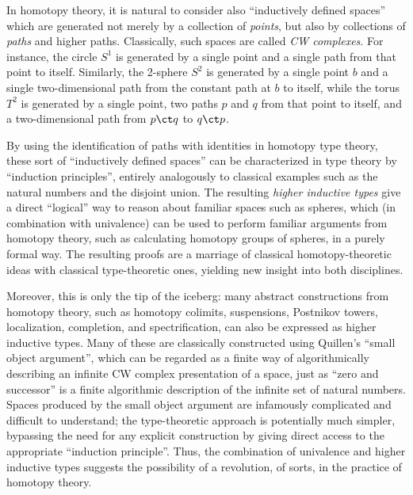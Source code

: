 In homotopy theory, it is natural to consider also ``inductively defined spaces'' which are generated not merely by a collection of \emph{points}, but also by collections of \emph{paths} and higher paths.
Classically, such spaces are called \emph{CW complexes}.
%
For instance, the circle $S^1$ is generated by a single point and a single path from that point to itself.
Similarly, the 2-sphere $S^2$ is generated by a single point $b$ and a single two-dimensional path from the constant path at $b$ to itself, while the torus $T^2$ is generated by a single point, two paths $p$ and $q$ from that point to itself, and a two-dimensional path from $p\ct q$ to $q\ct p$.

By using the identification of paths with identities in homotopy type theory, these sort of ``inductively defined spaces'' can be characterized in type theory by ``induction principles'', entirely analogously to classical examples such as the natural numbers and the disjoint union.
The resulting \emph{higher inductive types}
%
give a direct ``logical'' way to reason about familiar spaces such as spheres, which (in combination with univalence) can be used to perform familiar arguments from homotopy theory, such as calculating homotopy groups of spheres, in a purely formal way.
The resulting proofs are a marriage of classical homotopy-theoretic ideas with classical type-theoretic ones, yielding new insight into both disciplines.

Moreover, this is only the tip of the iceberg: many abstract constructions from homotopy theory, such as homotopy colimits, suspensions, Postnikov towers, localization, completion, and spectrification, can also be expressed as higher inductive types.
Many of these are classically constructed using Quillen's ``small object argument'', which can be regarded as a finite way of algorithmically describing an infinite CW complex presentation of a space, just as ``zero and successor'' is a finite algorithmic description of the infinite set of natural numbers.
Spaces produced by the small object argument are infamously complicated and difficult to understand; the type-theoretic approach is potentially much simpler, bypassing the need for any explicit construction by giving direct access to the appropriate ``induction principle''.
Thus, the combination of univalence and higher inductive types suggests the possibility of a revolution, of sorts, in the practice of homotopy theory.


